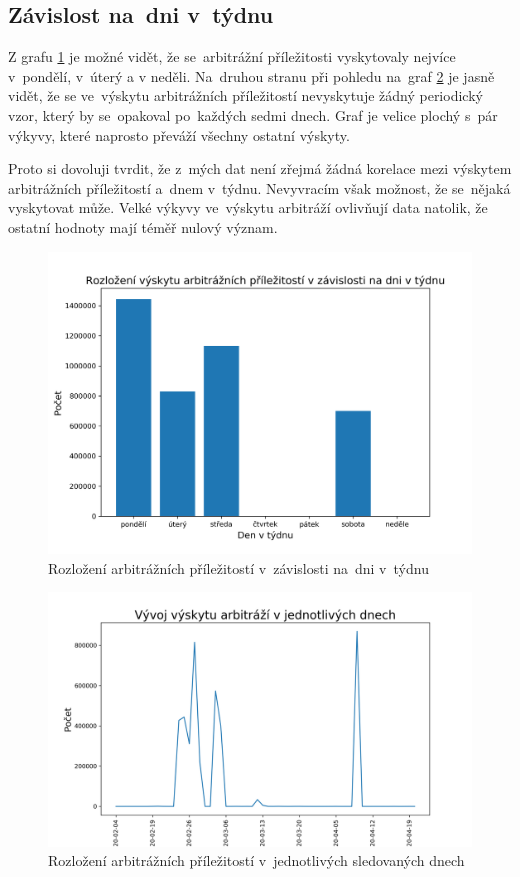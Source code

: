\documentclass[thesis=B,czech]{FITthesis}[2019/03/21]
\begin{document}
\subsection{Závislost na~dni v~týdnu}
Z grafu \ref{weekday_distribution} je možné vidět, že se~arbitrážní příležitosti vyskytovaly nejvíce v~pondělí, v~úterý a v neděli. Na~druhou stranu při pohledu na~graf \ref{occurences} je jasně vidět, že se ve~výskytu arbitrážních příležitostí nevyskytuje žádný periodický vzor, který by se~opakoval po~každých sedmi dnech. Graf je velice plochý s~pár výkyvy, které naprosto převáží všechny ostatní výskyty.

Proto si dovoluji tvrdit, že z~mých dat není zřejmá žádná korelace mezi výskytem arbitrážních příležitostí a~dnem v~týdnu. Nevyvracím však možnost, že se~nějaká vyskytovat může. Velké výkyvy ve~výskytu arbitráží ovlivňují data natolik, že ostatní hodnoty mají téměř nulový význam.

\begin{figure}\centering
	\includegraphics[width=1\textwidth]{images/weekday_distribution.png}
	\caption{Rozložení arbitrážních příležitostí v~závislosti na~dni v~týdnu }\label{weekday_distribution}
\end{figure}
\begin{figure}\centering
	\includegraphics[width=1\textwidth]{images/occurences.png}
	\caption{Rozložení arbitrážních příležitostí v~jednotlivých sledovaných dnech}\label{occurences}
\end{figure}
\end{document}
